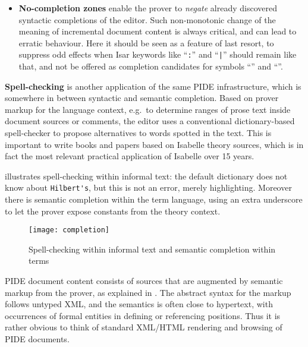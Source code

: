 \begin{isabellebody}
\begin{isamarkuptext}
\begin{itemize}
\begin{itemize}
\item \textbf{No-completion zones} enable the prover to \emph{negate}
already discovered syntactic completions of the editor. Such non-monotonic
change of the meaning of incremental document content is always critical,
and can lead to erratic behaviour. Here it should be seen as a feature of
last resort, to suppress odd effects when Isar keywords like ``\verb|:|'' and ``\verb||\verb,|,\verb||'' should remain like that, and not be offered
as completion candidates for symbols ``\isa{{\isasymin}}'' and ``\isa{{\isasymor}}''.

\end{itemize}

\end{itemize}

\textbf{Spell-checking} is another application of the same PIDE
infrastructure, which is somewhere in between syntactic and semantic
completion. Based on prover markup for the language context, e.g.\ to
determine ranges of prose text inside document sources or comments, the
editor uses a conventional dictionary-based spell-checker to propose
alternatives to words spotted in the text. This is important to write books
and papers based on Isabelle theory sources, which is in fact the most
relevant practical application of Isabelle over 15 years.

 illustrates spell-checking within informal text: the
default dictionary does not know about \verb,Hilbert's,, but this is not an
error, merely highlighting. Moreover there is semantic completion within the
term language, using an extra underscore to let the prover expose
constants from the theory context.

\begin{figure}[htb]
\begin{center}
\texttt{[image: completion]}
\end{center}
\caption{Spell-checking within informal text and semantic completion
  within terms}
\label{fig:completion}
\end{figure}\end{isamarkuptext}\isamarkuptrue {}
\isamarkuptrue \begin{isamarkuptext}PIDE document content consists of sources that are augmented by
semantic markup from the prover, as explained in \cite{Wenzel:2011:CICM}.
The abstract syntax for the markup follows untyped XML, and the semantics is
often close to hypertext, with occurrences of formal entities in defining or
referencing positions. Thus it is rather obvious to think of standard
XML/HTML rendering and browsing of PIDE documents.


\end{isamarkuptext}
\end{isabellebody}

